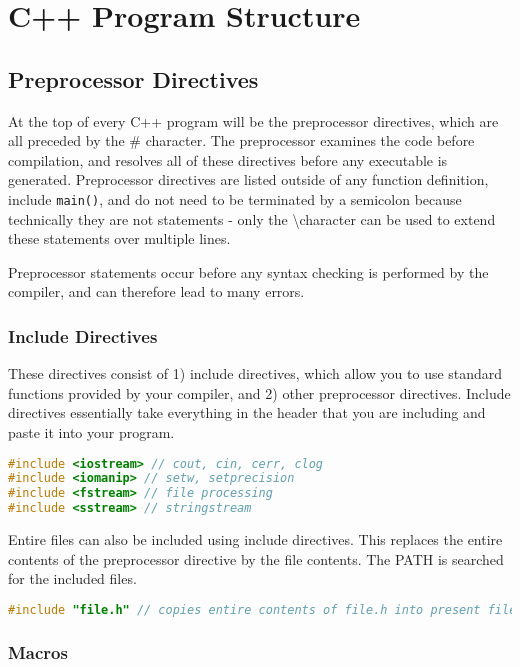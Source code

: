 \documentclass[10pt]{article}
\begin{document}
\section{C++ Program Structure}

\subsection{Preprocessor Directives}

At the top of every C++ program will be the preprocessor directives, which are all preceded by the \# character. The preprocessor examines the code before compilation, and resolves all of these directives before any executable is generated. Preprocessor directives are listed outside of any function definition, include \texttt{main()}, and do not need to be terminated by a semicolon because technically they are not statements - only the \textbackslash character can be used to extend these statements over multiple lines.

Preprocessor statements occur before any syntax checking is performed by the compiler, and can therefore lead to many errors. 

\subsubsection{Include Directives}

These directives consist of 1) include directives, which allow you to use standard functions provided by your compiler, and 2) other preprocessor directives. Include directives essentially take everything in the header that you are including and paste it into your program. 

\begin{lstlisting}[language=C++]
#include <iostream> // cout, cin, cerr, clog
#include <iomanip> // setw, setprecision
#include <fstream> // file processing
#include <sstream> // stringstream
\end{lstlisting}

Entire files can also be included using include directives. This replaces the entire contents of the preprocessor directive by the file contents. The PATH is searched for the included files. 

\begin{lstlisting}[language=C++]
#include "file.h" // copies entire contents of file.h into present file
\end{lstlisting}

\subsubsection{Macros}
\end{document}
